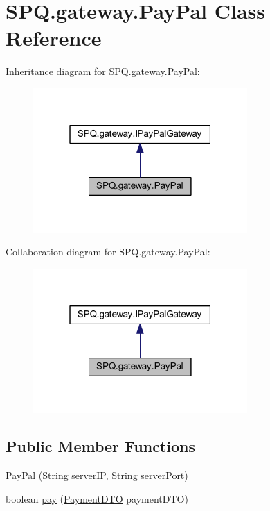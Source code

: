 \hypertarget{class_s_p_q_1_1gateway_1_1_pay_pal}{}\section{S\+P\+Q.\+gateway.\+Pay\+Pal Class Reference}
\label{class_s_p_q_1_1gateway_1_1_pay_pal}


Inheritance diagram for S\+P\+Q.\+gateway.\+Pay\+Pal\+:\nopagebreak
\begin{figure}[H]
\begin{center}
\leavevmode
\includegraphics[width=232pt]{class_s_p_q_1_1gateway_1_1_pay_pal__inherit__graph}
\end{center}
\end{figure}


Collaboration diagram for S\+P\+Q.\+gateway.\+Pay\+Pal\+:\nopagebreak
\begin{figure}[H]
\begin{center}
\leavevmode
\includegraphics[width=232pt]{class_s_p_q_1_1gateway_1_1_pay_pal__coll__graph}
\end{center}
\end{figure}
\subsection*{Public Member Functions}
\begin{DoxyCompactItemize}
\item 
\mbox{\hyperlink{class_s_p_q_1_1gateway_1_1_pay_pal_ab34e6213b4dbfeccc87da6bcd486bbf3}{Pay\+Pal}} (String server\+IP, String server\+Port)
\item 
boolean \mbox{\hyperlink{class_s_p_q_1_1gateway_1_1_pay_pal_a4f12e3d9fd7cc1ebf54e885df464f1d4}{pay}} (\mbox{\hyperlink{class_s_p_q_1_1dto_1_1_payment_d_t_o}{Payment\+D\+TO}} payment\+D\+TO)
\end{DoxyCompactItemize}


